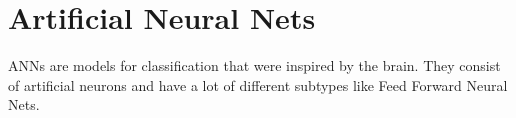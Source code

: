 \chapter{Artificial Neural Nets}\label{ch:ANNs}

\Glspl{ANN} are models for classification that were inspired by the brain.
They consist of artificial neurons and have a lot of different subtypes like
Feed Forward Neural Nets.


